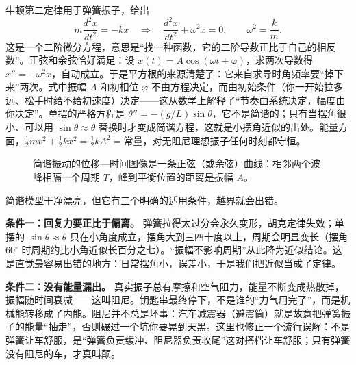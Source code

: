 \begin{mathbridge}
牛顿第二定律用于弹簧振子，给出
\[
  m\frac{d^{2}x}{dt^{2}}=-kx
  \quad\Longrightarrow\quad
  \frac{d^{2}x}{dt^{2}}+\omega^{2}x=0,
  \qquad \omega^{2}=\frac{k}{m}.
\]
这是一个二阶微分方程，意思是“找一种函数，它的二阶导数正比于自己的相反数”。正弦和余弦恰好满足：设 \(x(t)=A\cos(\omega t+\varphi)\)，求两次导数得 \(x''=-\omega^{2}x\)，自动成立。于是平方根的来源清楚了：它来自求导时角频率要“掉下来”两次。式中振幅 \(A\) 和初相位 \(\varphi\) 不由方程决定，而由初始条件（你一开始拉多远、松手时给不给初速度）决定——这从数学上解释了“节奏由系统决定，幅度由你决定”。单摆的严格方程是 \(\theta''=-(g/L)\sin\theta\)，它不是简谐的；只有当摆角很小、可以用 \(\sin\theta\approx\theta\) 替换时才变成简谐方程，这就是小摆角近似的出处。能量方面，\(\frac12 mv^{2}+\frac12 kx^{2}=\frac12 kA^{2}=\text{常量}\)，对无阻尼理想振子任何时刻都守恒。
\end{mathbridge}

\begin{figure}[htbp]
\centering
{}
\caption{简谐振动的位移—时间图像是一条正弦（或余弦）曲线：相邻两个波峰相隔一个周期 \(T\)，峰到平衡位置的距离是振幅 \(A\)。}
\end{figure}


简谐模型干净漂亮，但它有三个明确的适用条件，越界就会出错。

\textbf{条件一：回复力要正比于偏离。} 弹簧拉得太过分会永久变形，胡克定律失效；单摆的 \(\sin\theta\approx\theta\) 只在小角度成立，摆角大到三四十度以上，周期会明显变长（摆角 \(60^{\circ}\) 时周期约比小角近似长百分之七）。“振幅不影响周期”从此降为近似结论。这是直觉最容易出错的地方：日常摆角小，误差小，于是我们把近似当成了定律。

\textbf{条件二：没有能量漏出。} 真实振子总有摩擦和空气阻力，能量不断变成热散掉，振幅随时间衰减——这叫阻尼。钥匙串最终停下，不是谁的“力气用完了”，而是机械能转移成了内能。阻尼并不总是坏事：汽车减震器（避震筒）就是故意把弹簧振子的能量“抽走”，否则碾过一个坑你要晃到天黑。这里也修正一个流行误解：不是弹簧让车舒服，是“弹簧负责缓冲、阻尼器负责收尾”这对搭档让车舒服；只有弹簧没有阻尼的车，才真叫颠。

